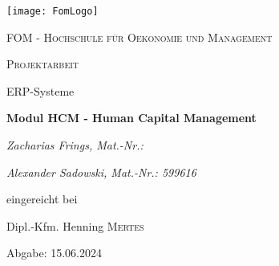 \begin{titlepage}

	\centering
	\texttt{[image: FomLogo]}\par\vspace{1cm}
	{\scshape\LARGE FOM - Hochschule für Oekonomie und Management \par}
	\vspace{1cm}
	{\scshape\Large Projektarbeit\par ERP-Systeme\par}
	\vspace{1.5cm}
	{\huge\bfseries Modul HCM - Human Capital Management\par}
	\vspace{2cm}
	{\Large\itshape Zacharias Frings, Mat.-Nr.:\par}
	{\Large\itshape Alexander Sadowski, Mat.-Nr.: 599616\par}
	\vfill
	eingereicht bei\par
	Dipl.-Kfm. Henning \textsc{Mertes}

	\vfill

	{\large Abgabe: 15.06.2024\par}
\end{titlepage}
